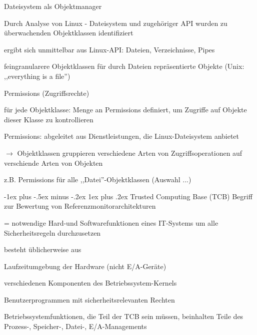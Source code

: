 \documentclass[a4paper]{article}
\makeatletter
\renewcommand{\subsubsection}{\@startsection{subsubsection}{3}{0mm}%
 {-1ex plus -.5ex minus -.2ex}%
 {1ex plus .2ex}%
 {\normalfont\small\bfseries}}
\makeatother
\begin{document}
\begin{multicols}{3}
    Dateisystem als Objektmanager
    \begin{itemize*}
        \item Durch Analyse von Linux - Dateisystem und zugehöriger API wurden zu überwachenden Objektklassen identifiziert
        \item ergibt sich unmittelbar aus Linux-API: Dateien, Verzeichnisse, Pipes
        \item feingranularere Objektklassen für durch Dateien repräsentierte Objekte (Unix: ,,everything is a file'')
    \end{itemize*}

    Permissions (Zugriffsrechte)
    \begin{itemize*}
        \item für jede Objektklasse: Menge an Permissions definiert, um Zugriffe auf Objekte dieser Klasse zu kontrollieren
        \item Permissions: abgeleitet aus Dienstleistungen, die Linux-Dateisystem anbietet
        \item[$\rightarrow$] Objektklassen gruppieren verschiedene Arten von Zugriffsoperationen auf verschiende Arten von Objekten
        \item z.B. Permissions für alle ,,Datei''-Objektklassen (Auswahl ...)
    \end{itemize*}

    \subsubsection{Trusted Computing Base (TCB)}
    Begriff zur Bewertung von Referenzmonitorarchitekturen
    \begin{itemize*}
        \item[=] notwendige Hard-und Softwarefunktionen eines IT-Systems um alle Sicherheitsregeln durchzusetzen
        \item besteht üblicherweise aus
        \begin{enumerate*}
            \item Laufzeitumgebung der Hardware (nicht E/A-Geräte)
            \item verschiedenen Komponenten des Betriebssystem-Kernels
            \item Benutzerprogrammen mit sicherheitsrelevanten Rechten
        \end{enumerate*}
        \item Betriebssystemfunktionen, die Teil der TCB sein müssen, beinhalten Teile des Prozess-, Speicher-, Datei-, E/A-Managements
    \end{itemize*}


\end{multicols}
\end{document}
